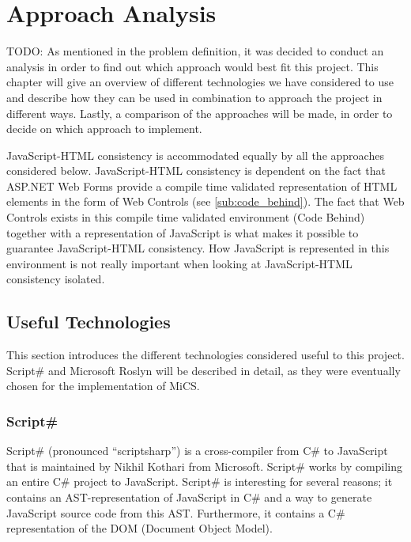 \chapter{Approach Analysis}
	TODO: As mentioned in the problem definition, it was decided to conduct an analysis in order to find out which approach would best fit this project. This chapter will give an overview of different technologies we have considered to use and describe how they can be used in combination to approach the project in different ways. Lastly, a comparison of the approaches will be made, in order to decide on which approach to implement.

	JavaScript-HTML consistency is accommodated equally by all the approaches considered below. JavaScript-HTML consistency is dependent on the fact that ASP.NET Web Forms provide a compile time validated representation of HTML elements in the form of Web Controls (see \ref{sub:code_behind}). The fact that Web Controls exists in this compile time validated environment (Code Behind) together with a representation of JavaScript is what makes it possible to guarantee JavaScript-HTML consistency. How JavaScript is represented in this environment is not really important when looking at JavaScript-HTML consistency isolated.

\section{Useful Technologies}
	This section introduces the different technologies considered useful to this project. Script\# and Microsoft Roslyn will be described in detail, as they were eventually chosen for the implementation of MiCS.

	

	\subsection{Script\#} %
	\label{sub:subsection_scriptsharp}
		Script\# (pronounced ``scriptsharp'') \cite{scriptsharp} is a cross-compiler from C\# to JavaScript that is maintained by Nikhil Kothari \cite{nikhilk} from Microsoft. Script\# works by compiling an entire C\# project to JavaScript. Script\# is interesting for several reasons; it contains an AST-representation of JavaScript in C\# and a way to generate JavaScript source code from this AST. Furthermore, it contains a C\# representation of the DOM (Document Object Model).

